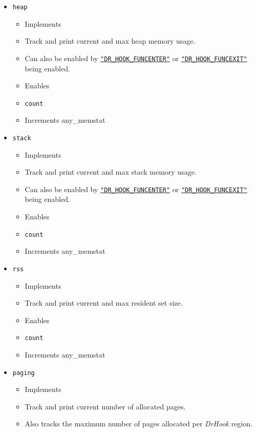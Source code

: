 \begin{itemize}
\begin{itemize}
    \end{itemize}
    \item\verb+heap+
    \begin{itemize}
        \item[] Implements
        \item Track and print current and max heap memory usage.
        \item Can also be enabled by \hyperref[section:flags:DR_HOOK_FUNCENTER]{\texttt{"DR\_HOOK\_FUNCENTER"}} or \hyperref[section:flags:DR_HOOK_FUNCEXIT]{\texttt{"DR\_HOOK\_FUNCEXIT"}} being enabled.
        \item[] Enables\item \verb+count+
        \item Increments any\_memstat
    \end{itemize}
    \item\verb+stack+
    \begin{itemize}
        \item[] Implements
        \item Track and print current and max stack memory usage.
        \item Can also be enabled by \hyperref[section:flags:DR_HOOK_FUNCENTER]{\texttt{"DR\_HOOK\_FUNCENTER"}} or \hyperref[section:flags:DR_HOOK_FUNCEXIT]{\texttt{"DR\_HOOK\_FUNCEXIT"}} being enabled.
        \item[] Enables\item \verb+count+
        \item Increments any\_memstat
    \end{itemize}
    \item\verb+rss+
    \begin{itemize}
        \item[] Implements
        \item Track and print current and max resident set size.
        \item[] Enables\item \verb+count+
        \item Increments any\_memstat
    \end{itemize}
    \item\verb+paging+
    \begin{itemize}
        \item[] Implements
        \item Track and print current number of allocated pages.
        \item Also tracks the maximum number of pages allocated per \textit{DrHook} region.

\end{itemize}
\end{itemize}
